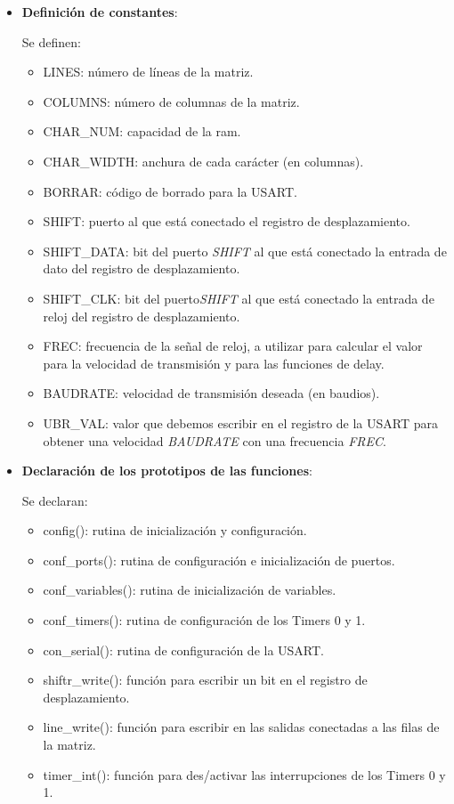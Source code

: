 \begin{itemize}
\item{\textbf{Definición de constantes}:
  

  Se definen:
  \begin{itemize}
    \item{LINES: número de líneas de la matriz.}
    \item{COLUMNS: número de columnas de la matriz.}
    \item{CHAR\_NUM: capacidad de la ram.}
    \item{CHAR\_WIDTH: anchura de cada carácter (en columnas).}
    \item{BORRAR: código de borrado para la USART.}
    \item{SHIFT: puerto al que está conectado el registro de desplazamiento.}
    \item{SHIFT\_DATA: bit del puerto \textit{SHIFT} al que está conectado la entrada de dato del registro de desplazamiento.}
    \item{SHIFT\_CLK: bit del puerto\textit{SHIFT} al que está conectado la entrada de reloj del registro de desplazamiento.}
    \item{FREC: frecuencia de la señal de reloj, a utilizar para calcular el valor para la velocidad de transmisión y para las funciones de delay.}
    \item{BAUDRATE: velocidad de transmisión deseada (en baudios).}
    \item{UBR\_VAL: valor que debemos escribir en el registro de la USART para obtener una velocidad \textit{BAUDRATE} con una frecuencia \textit{FREC}.}
  \end{itemize}
}

\item{\textbf{Declaración de los prototipos de las funciones}:
  

  Se declaran:
  \begin{itemize}
     \item{config(): rutina de inicialización y configuración.}
     \item{conf\_ports(): rutina de configuración e inicialización de puertos.}
     \item{conf\_variables(): rutina de inicialización de variables.}
     \item{conf\_timers(): rutina de configuración de los Timers 0 y 1.}
     \item{con\_serial(): rutina de configuración de la USART.}
     \item{shiftr\_write(): función para escribir un bit en el registro de desplazamiento.}
     \item{line\_write(): función para escribir en las salidas conectadas a las filas de la matriz.}
     \item{timer\_int(): función para des/activar las interrupciones de los Timers 0 y 1.}
  \end{itemize}
}


\end{itemize}
